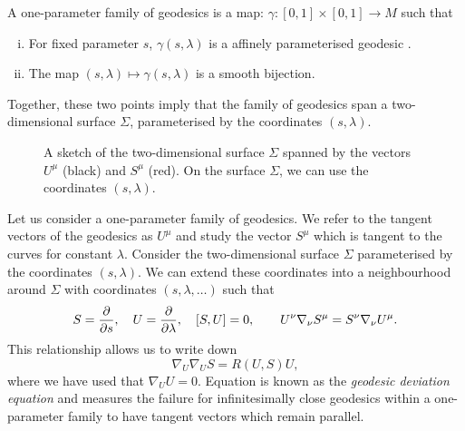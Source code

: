 \begin{defn}
A one-parameter family of geodesics is a map: $\gamma : [0,1] \times [0,1] \rightarrow M$ such that
\begin{enumerate}[(i)]
\item For fixed parameter $s$, $\gamma(s,\lambda)$ is a affinely parameterised geodesic .
\item The map $(s,\lambda) \mapsto \gamma(s,\lambda)$ is a smooth bijection.
\end{enumerate}
Together, these two points imply that the family of geodesics span a two-dimensional surface $\Sigma$, parameterised by the coordinates $(s,\lambda)$.
\end{defn}

\begin{figure}[!h]
\centering
{}
\caption[Illustration of two-dimensional hypersurface to aid discussion of congruences]{A sketch of the two-dimensional surface $\Sigma$ spanned by the vectors $U^\mu$ (black) and $S^\mu$ (red). On the surface $\Sigma$, we can use the coordinates $(s,\lambda)$.}
\end{figure}

Let us consider a one-parameter family of geodesics. We refer to the tangent vectors of the geodesics as $U^\mu$ and study the vector $S^\mu$ which is tangent to the curves for constant $\lambda$. Consider the two-dimensional surface $\Sigma$ parameterised by the coordinates $(s,\lambda)$. We can extend these coordinates into a neighbourhood around $\Sigma$ with coordinates $(s,\lambda,\ldots)$ such that
\begin{equation*}
	S = \frac{\partial }{\partial s}, \quad U = \frac{\partial }{\partial \lambda}, \quad [S,U] = 0, \qquad U^\nu \nabla_\nu S^\mu = S^\nu \nabla_\nu U^\mu.
\end{equation*}
This relationship allows us to write down
\begin{equation}
\label{eq:geodeviation}
	\nabla_U \nabla_U S = R(U,S) U,
\end{equation}
where we have used that $\nabla_U U = 0$. Equation  is known as the \emph{geodesic deviation equation} and measures the failure for infinitesimally close geodesics within a one-parameter family to have tangent vectors which remain parallel. 
	
